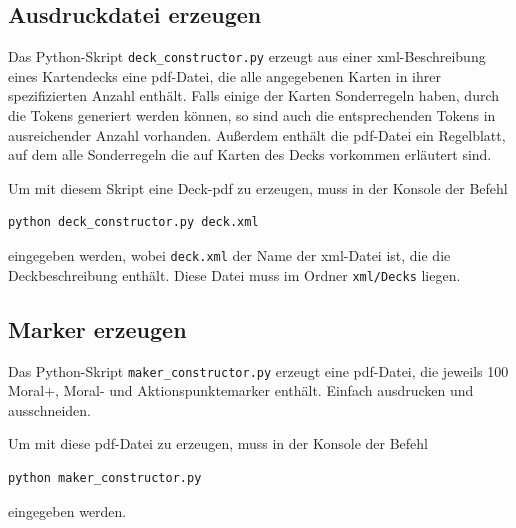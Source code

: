 \documentclass[a4paper,11pt]{report}
\begin{document}
\subsection{Ausdruckdatei erzeugen}
Das Python-Skript \verb+deck_constructor.py+ erzeugt aus einer xml-Beschreibung eines Kartendecks eine pdf-Datei, die alle angegebenen Karten in ihrer spezifizierten Anzahl enthält. Falls einige der Karten Sonderregeln haben, durch die Tokens generiert werden können, so sind auch die entsprechenden Tokens in ausreichender Anzahl vorhanden. Außerdem enthält die pdf-Datei ein Regelblatt, auf dem alle Sonderregeln die auf Karten des Decks vorkommen erläutert sind.

Um mit diesem Skript eine Deck-pdf zu erzeugen, muss in der Konsole der Befehl
\begin{lstlisting}
python deck_constructor.py deck.xml
\end{lstlisting}
eingegeben werden, wobei \verb+deck.xml+ der Name der xml-Datei ist, die die Deckbeschreibung enthält. Diese Datei muss im Ordner \verb+xml/Decks+ liegen.

\subsection{Marker erzeugen}
Das Python-Skript \verb+maker_constructor.py+ erzeugt eine pdf-Datei, die jeweils 100 Moral+, Moral- und Aktionspunktemarker enthält. Einfach ausdrucken und ausschneiden.

Um mit diese pdf-Datei zu erzeugen, muss in der Konsole der Befehl
\begin{lstlisting}
python maker_constructor.py
\end{lstlisting}
eingegeben werden.
\end{document}
